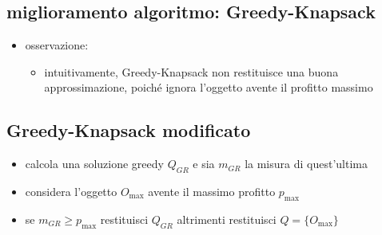
\subsection*{miglioramento algoritmo: Greedy-Knapsack}
\begin{flushleft}
	\begin{itemize}
		\item osservazione:
		\begin{itemize}
			\item intuitivamente, Greedy-Knapsack non restituisce una buona approssimazione, poich\'e ignora l'oggetto avente il profitto massimo
		\end{itemize}
	\end{itemize}
\end{flushleft}


\subsection*{Greedy-Knapsack modificato}
\begin{flushleft}
	\begin{itemize}
		\item calcola una soluzione greedy $Q_{GR}$ e sia $m_{GR}$ la misura di quest'ultima
		\item considera l'oggetto $O_{\max}$ avente il massimo profitto $p_{\max}$ \item se $m_{GR}\geq p_{\max}$ restituisci $Q_{GR}$ altrimenti restituisci $Q=\{O_{\max}\}$
	\end{itemize}
\end{flushleft}


